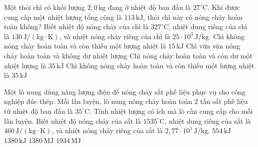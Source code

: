\begin{ex}
Một thỏi chì có khối lượng $2,0\,\mathrm{kg}$ đang ở nhiệt độ ban đầu là $27^{\circ}\mathrm{C}$. Khi được cung cấp một nhiệt lượng tổng cộng là $113\,\mathrm{kJ}$, thỏi chì này có nóng chảy hoàn toàn không? Biết nhiệt độ nóng chảy của chì là $327^{\circ}\mathrm{C}$, nhiệt dung riêng của chì là $130\,\mathrm{J/(kg\cdot K)}$, và nhiệt nóng chảy riêng của chì là $25\cdot 10^3\,\mathrm{J/kg}$.
\choice
{\True Chì không nóng chảy hoàn toàn và còn thiếu một lượng nhiệt là $15\,\mathrm{kJ}$}
{Chì vừa vặn nóng chảy hoàn toàn và không dư nhiệt lượng}
{Chì nóng chảy hoàn toàn và còn dư một nhiệt lượng là $35\,\mathrm{kJ}$}
{Chì không nóng chảy hoàn toàn và còn thiếu một lượng nhiệt là $35\,\mathrm{kJ}$}
\end{ex}

\begin{ex}
Một lò nung dùng năng lượng điện để nóng chảy sắt phế liệu phục vụ cho công nghiệp đúc thép. Mỗi lần luyện, lò nung nóng chảy hoàn toàn $2$ tấn sắt phế liệu từ nhiệt độ ban đầu là $35^{\circ}\mathrm{C}$. Tính nhiệt lượng có ích mà lò cần cung cấp cho mỗi lần luyện. Biết nhiệt độ nóng chảy của sắt là $1535^{\circ}\mathrm{C}$, nhiệt dung riêng của sắt là $460\,\mathrm{J/(kg\cdot K)}$, và nhiệt nóng chảy riêng của sắt là $2,77\cdot 10^5\,\mathrm{J/kg}$.
\choice
{$554\,\mathrm{kJ}$}
{$1380\,\mathrm{kJ}$}
{$1380\,\mathrm{MJ}$}
{\True $1934\,\mathrm{MJ}$}
\end{ex}

